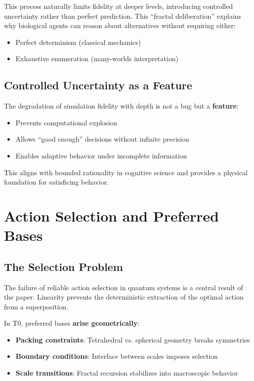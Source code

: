 	This process naturally limits fidelity at deeper levels, introducing controlled uncertainty rather than perfect prediction. This ``fractal deliberation'' explains why biological agents can reason about alternatives without requiring either:
	
	\begin{itemize}
		\item Perfect determinism (classical mechanics)
		\item Exhaustive enumeration (many-worlds interpretation)
	\end{itemize}
	
	\subsection{Controlled Uncertainty as a Feature}
	
	The degradation of simulation fidelity with depth is not a bug but a \textbf{feature}:
	
	\begin{itemize}
		\item Prevents computational explosion
		\item Allows ``good enough'' decisions without infinite precision
		\item Enables adaptive behavior under incomplete information
	\end{itemize}
	
	This aligns with bounded rationality in cognitive science and provides a physical foundation for satisficing behavior.
	
	\section{Action Selection and Preferred Bases}
	
	\subsection{The Selection Problem}
	
	The failure of reliable action selection in quantum systems is a central result of the paper. Linearity prevents the deterministic extraction of the optimal action from a superposition.
	
	In T0, preferred bases \textbf{arise geometrically}:
	
	\begin{itemize}
		\item \textbf{Packing constraints}: Tetrahedral vs. spherical geometry breaks symmetries
		\item \textbf{Boundary conditions}: Interface between scales imposes selection
		\item \textbf{Scale transitions}: Fractal recursion stabilizes into macroscopic behavior
	\end{itemize}
	
